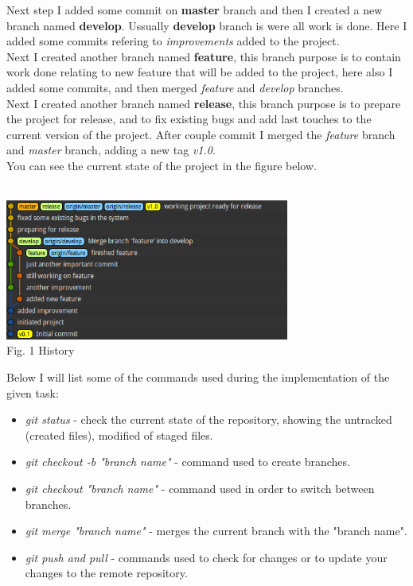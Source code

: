 \documentclass[12pt]{article}
\begin{document}
    Next step I added some commit on \textbf{master} branch and then I created a new branch named \textbf{develop}. Ussually
    \textbf{develop} branch is were all work is done. Here I added some commits refering to \textit{improvements} added to the project. \\

    Next I created another branch named \textbf{feature}, this branch purpose is to contain work done relating to new feature that will
    be added to the project, here also I added some commits, and then merged \textit{feature} and \textit{develop} branches. \\

    Next I created another branch named \textbf{release}, this branch purpose is to prepare the project for release, and to fix existing
    bugs and add last touches to the current version of the project. After couple commit I merged the \textit{feature} branch and
    \textit{master} branch, adding a new tag \textit{v1.0}. \\

    You can see the current state of the project in the figure below. \\ \\

    \begin{minipage}[b]{1.0\linewidth}
      \begin{center}
        \includegraphics[width=0.7\textwidth]{work}
         \\ Fig. 1 History
      \end{center}
    \end{minipage}

    \newpage

    Below I will list some of the commands used during the implementation of the given task:

    \begin{itemize}
      \item \textit{git status} - check the current state of the repository, showing the untracked (created files),
      modified of staged files.
      \item \textit{git checkout -b "branch name"} - command used to create branches.
      \item \textit{git checkout "branch name"} - command used in order to switch between branches.
      \item \textit{git merge "branch name"} - merges the current branch with the "branch name".
      \item \textit{git push and pull} - commands used to check for changes or to update your changes to the
      remote repository.
    \end{itemize}
\end{document}
